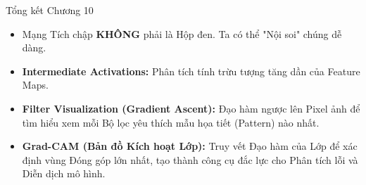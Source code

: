 \documentclass[aspectratio=169]{beamer}
\begin{document}
\begin{frame}{Tổng kết Chương 10}
    \begin{itemize}
        \item Mạng Tích chập \textbf{KHÔNG} phải là Hộp đen. Ta có thể "Nội soi" chúng dễ dàng.
        \item \textbf{Intermediate Activations:} Phân tích tính trừu tượng tăng dần của Feature Maps.
        \item \textbf{Filter Visualization (Gradient Ascent):} Đạo hàm ngược lên Pixel ảnh để tìm hiểu xem mỗi Bộ lọc yêu thích mẫu họa tiết (Pattern) nào nhất.
        \item \textbf{Grad-CAM (Bản đồ Kích hoạt Lớp):} Truy vết Đạo hàm của Lớp để xác định vùng Đóng góp lớn nhất, tạo thành công cụ đắc lực cho Phân tích lỗi và Diễn dịch mô hình.
    \end{itemize}
\end{frame}
\end{document}
